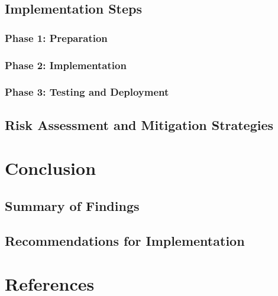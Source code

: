 \documentclass[11pt]{article}
\begin{document}
\subsection{Implementation Steps}
\subsubsection{Phase 1: Preparation}
\subsubsection{Phase 2: Implementation}
\subsubsection{Phase 3: Testing and Deployment}
\subsection{Risk Assessment and Mitigation Strategies}

\section{Conclusion}
\subsection{Summary of Findings}
\subsection{Recommendations for Implementation}

\section{References}

\printbibliography
\end{document}
